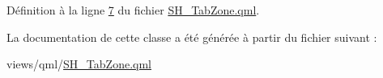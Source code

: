 Définition à la ligne \hyperlink{SH__TabZone_8qml_source_l00007}{7} du fichier \hyperlink{SH__TabZone_8qml_source}{S\-H\-\_\-\-Tab\-Zone.\-qml}.



La documentation de cette classe a été générée à partir du fichier suivant \-:\begin{DoxyCompactItemize}
\item 
views/qml/\hyperlink{SH__TabZone_8qml}{S\-H\-\_\-\-Tab\-Zone.\-qml}\end{DoxyCompactItemize}
